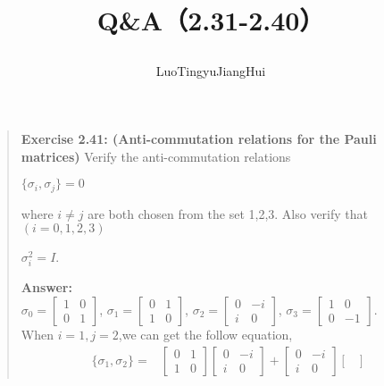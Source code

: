 \documentclass[UTF8]{ctexart}
\begin{document}
	\title{\textbf{Q\&A（2.31-2.40）}\\[1ex]\begin{large}
		\end{large}}
	\author{LuoTingyu\quad JiangHui}
	\maketitle
\begin{quote}
\textbf{Exercise 2.41: (Anti-commutation relations for the Pauli matrices)} Verify the
anti-commutation relations
\begin{center}
	$\{\sigma_{i},\sigma_{j}\} = 0$
\end{center}
where $i \neq j$ are both chosen from the set 1,2,3. Also verify that $(i = 0,1,2,3)$
\begin{center}
	$\sigma_{i}^{2} = I$.
\end{center}
\textbf{Answer:}\\
$\sigma_{0}=
\begin{bmatrix}
1 & 0 \\
0 & 1	
\end{bmatrix}$,
$\sigma_{1}=
\begin{bmatrix}
0 & 1 \\
1 & 0	
\end{bmatrix}$,
$\sigma_{2}=
\begin{bmatrix}
0 & -i \\
i & 0	
\end{bmatrix}$,
$\sigma_{3}=
\begin{bmatrix}
1 & 0 \\
0 & -1	
\end{bmatrix}$.
\\
When $i=1, j=2$,we can get the follow equation,
\\
\begin{equation}
	\begin{aligned}
		\{\sigma_{1},\sigma_{2}\}=&
			\begin{bmatrix}
				0 & 1 \\
				1 & 0	
				\end{bmatrix}
				\begin{bmatrix}
					0 & -i \\
					i & 0	
					\end{bmatrix}
				+
				\begin{bmatrix}
					0 & -i \\
					i & 0	
					\end{bmatrix}
				\begin{bmatrix}

\end{bmatrix}
\end{aligned}
\end{equation}
\end{quote}
\end{document}
